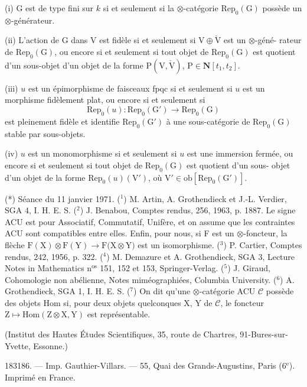 (i) G est de type fini sur $k$ si et seulement si la $\otimes$-catégorie $\mathrm{Rep}_0(\mathrm{G})$
possède un $\otimes$-générateur.

(ii) L'action de G dans V est fidèle si et seulement si $\mathrm{V}\oplus\check{\mathrm{V}}$ est un $\otimes$-géné-%
rateur de $\mathrm{Rep}_0(\mathrm{G})$, ou encore si et seulement si tout objet de $\mathrm{Rep}_0(\mathrm{G})$ est
quotient d'un sous-objet d'un objet de la forme $\mathrm{P}(\mathrm{V},\check{\mathrm{V}})$, $\mathrm{P}\in\mathbf{N}[t_1, t_2]$.

(iii) $u$ est un épimorphisme de faisceaux fpqc si et seulement si $u$ est un
morphisme fidèlement plat, ou encore si et seulement si
\[ \mathrm{Rep}_0(u) : \mathrm{Rep}_0(\mathrm{G}') \to \mathrm{Rep}_0(\mathrm{G}) \]
est pleinement fidèle et identifie $\mathrm{Rep}_0(\mathrm{G}')$ à une sous-catégorie de $\mathrm{Rep}_0(\mathrm{G})$
stable par sous-objets.

(iv) $u$ est un monomorphisme si et seulement si $u$ est une immersion fermée,
ou encore si et seulement si tout objet de $\mathrm{Rep}_0(\mathrm{G})$ est quotient d'un sous-%
objet d'un objet de la forme $\mathrm{Rep}_0(u)(\mathrm{V}')$, où $\mathrm{V}'\in\mathrm{ob}[\mathrm{Rep}_0(\mathrm{G}')]$.

(*) Séance du 11 janvier 1971.
(${}^1$) M. Artin, A. Grothendieck et J.-L. Verdier, SGA 4, I. H. E. S.
(${}^2$) J. Benabou, Comptes rendus, 256, 1963, p. 1887. Le signe ACU est pour Associatif,
Commutatif, Unifère, et on assume que les contraintes ACU sont compatibles entre elles.
Enfin, pour nous, si F est un $\otimes$-foncteur, la flèche $\mathrm{F(X)}\otimes\mathrm{F(Y)}\to\mathrm{F(X}\otimes\mathrm{Y)}$ est un
isomorphisme.
(${}^3$) P. Cartier, Comptes rendus, 242, 1956, p. 322.
(${}^4$) M. Demazure et A. Grothendieck, SGA 3, Lecture Notes in Mathematics n${}^{\mathrm{os}}$ 151,
152 et 153, Springer-Verlag.
(${}^5$) J. Giraud, Cohomologie non abélienne, Notes miméographiées, Columbia University.
(${}^6$) A. Grothendieck, SGA 1, I. H. E. S.
(${}^7$) On dit qu'une $\otimes$-catégorie ACU $\mathcal{C}$ possède des objets Hom si, pour deux objets
quelconques X, Y de $\mathcal{C}$, le foncteur $\mathrm{Z}\mapsto\mathrm{Hom}(\mathrm{Z}\otimes\mathrm{X},\mathrm{Y})$ est représentable.

(Institut des Hautes Études
Scientifiques,
35, route de Chartres,
91-Bures-sur-Yvette,
Essonne.)

183186. --- Imp. Gauthier-Villars. --- 55, Quai des Grands-Augustins, Paris (6${}^{\mathrm{e}}$).
Imprimé en France.

